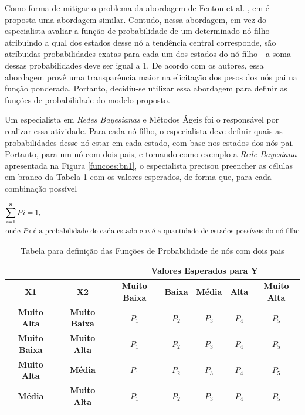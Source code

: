 Como forma de mitigar o problema da abordagem de Fenton et al. \cite{fenton}, em \cite{laitila} é proposta uma abordagem similar. Contudo, nessa abordagem, em vez do especialista avaliar a função de probabilidade de um determinado nó filho atribuindo a qual dos estados desse nó a tendência central corresponde, são atríbuidas probabilidades exatas para cada um dos estados do nó filho - a soma dessas probabilidades deve ser igual a 1. De acordo com os autores, essa abordagem provê uma transparência maior na elicitação dos pesos dos nós pai na função ponderada. Portanto, decidiu-se utilizar essa abordagem para definir as funções de probabilidade do modelo proposto.

Um especialista em \textit{Redes Bayesianas} e Métodos Ágeis foi o responsável por realizar essa atividade. Para cada nó filho, o especialista deve definir quais as probabilidades desse nó estar em cada estado, com base nos estados dos nós pai. Portanto, para um nó com dois pais, e tomando como exemplo a \textit{Rede Bayesiana} apresentada na Figura \ref{funcoes:bn1}, o especialista precisou preencher as células em branco da Tabela \ref{funcoes:2nos} com os valores esperados, de forma que, para cada combinação possível

\begin{align}
  \sum_{i=1}^{n}Pi = 1,\\ \intertext{onde $Pi$ é a probabilidade de cada estado e $n$ é a quantidade de estados possíveis do nó filho}
\end{align}

\begin{table}[ht!]
\centering
\caption{Tabela para definição das Funções de Probabilidade de nós com dois pais}
\label{funcoes:2nos}
\begin{tabular}{|c|c|c|c|c|c|c|}
\hline
\multicolumn{2}{|l|}{}                      & \multicolumn{5}{c|}{\textbf{Valores Esperados para Y}}                                       \\ \hline
\textbf{X1}          & \textbf{X2}          & \textbf{Muito Baixa} & \textbf{Baixa} & \textbf{Média} & \textbf{Alta} & \textbf{Muito Alta} \\ \hline
\textbf{Muito Alta}  & \textbf{Muito Baixa} & $P_{1}$              & $P_{2}$        & $P_{3}$        & $P_{4}$       & $P_{5}$              \\ \hline
\textbf{Muito Baixa} & \textbf{Muito Alta}  & $P_{1}$              & $P_{2}$        & $P_{3}$        & $P_{4}$       & $P_{5}$             \\ \hline
\textbf{Muito Alta}  & \textbf{Média}       & $P_{1}$              & $P_{2}$        & $P_{3}$        & $P_{4}$       & $P_{5}$             \\ \hline
\textbf{Média}       & \textbf{Muito Alta}  & $P_{1}$              & $P_{2}$        & $P_{3}$        & $P_{4}$       & $P_{5}$             \\ \hline
\end{tabular}
\end{table}

